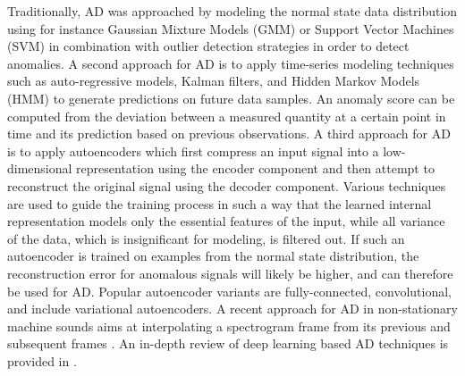 \documentclass[11pt]{article}
\begin{document}
Traditionally, AD was approached by modeling the normal state data distribution using for instance Gaussian Mixture Models (GMM) or Support Vector Machines (SVM) in combination with outlier detection strategies in order to detect anomalies.
A second approach for AD is to apply time-series modeling techniques such as auto-regressive models, Kalman filters, and Hidden Markov Models (HMM) to generate predictions on future data samples. 
An anomaly score can be computed from the deviation between a measured quantity at a certain point in time and its prediction based on previous observations.
A third approach for AD is to apply autoencoders \cite{hinton2006autoencoders,vincent2010stacked,baldi2012autoencoders} which first compress an input signal into a low-dimensional representation using the encoder component and then attempt to reconstruct the original signal using the decoder component. Various techniques are used to guide the training process in such a way that the learned internal representation models only the essential features of the input, while all variance of the data, which is insignificant for modeling, is filtered out. If such an autoencoder is trained on examples from the normal state distribution, the reconstruction error for anomalous signals will likely be higher, and can therefore be used for AD. Popular autoencoder variants are fully-connected, convolutional, and include variational autoencoders.
A recent approach for AD in non-stationary machine sounds aims at interpolating a spectrogram frame from its previous and subsequent frames \cite{Hayashi2020}. 
An in-depth review of deep learning based AD techniques is provided in \cite{Chalapathy:2019:AD:ARXIV}.





\end{document}
